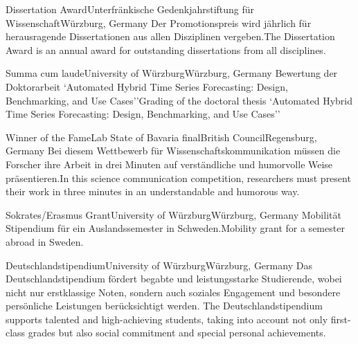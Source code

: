 \begin{cventries}
	{Dissertation Award}{Unterfränkische Gedenkjahrstiftung für Wissenschaft}{Würzburg, Germany}%
    {}%
    {Der Promotionspreis wird jährlich für herausragende Dissertationen aus allen Disziplinen vergeben.}{The Dissertation Award is an annual award for outstanding dissertations from all disciplines.}


	{Summa cum laude}{University of Würzburg}{Würzburg, Germany}%
    {}%
    {Bewertung der Doktorarbeit `Automated Hybrid Time Series Forecasting: Design, Benchmarking, and Use Cases''}{Grading of the doctoral thesis `Automated Hybrid Time Series Forecasting: Design, Benchmarking, and Use Cases''}

	{Winner of the FameLab State of Bavaria final}{British Council}{Regensburg, Germany}%
    {}%
    {Bei diesem Wettbewerb für Wissenschaftskommunikation müssen die Forscher ihre Arbeit in drei Minuten auf verständliche und humorvolle Weise präsentieren.}{In this science communication competition, researchers must present their work in three minutes in an understandable and humorous way.}

	{Sokrates/Erasmus Grant}{University of Würzburg}{Würzburg, Germany}%
    {}%
    {Mobilität Stipendium für ein Auslandssemester in Schweden.}{Mobility grant for a semester abroad in Sweden.}

	{Deutschlandstipendium}{University of Würzburg}{Würzburg, Germany}%
    {}%
    {Das Deutschlandstipendium fördert begabte und leistungsstarke Studierende, wobei nicht nur erstklassige Noten, sondern auch soziales Engagement und besondere persönliche Leistungen berücksichtigt werden.  }{The Deutschlandstipendium supports talented and high-achieving students, taking into account not only first-class grades but also social commitment and special personal achievements. }


\end{cventries}
